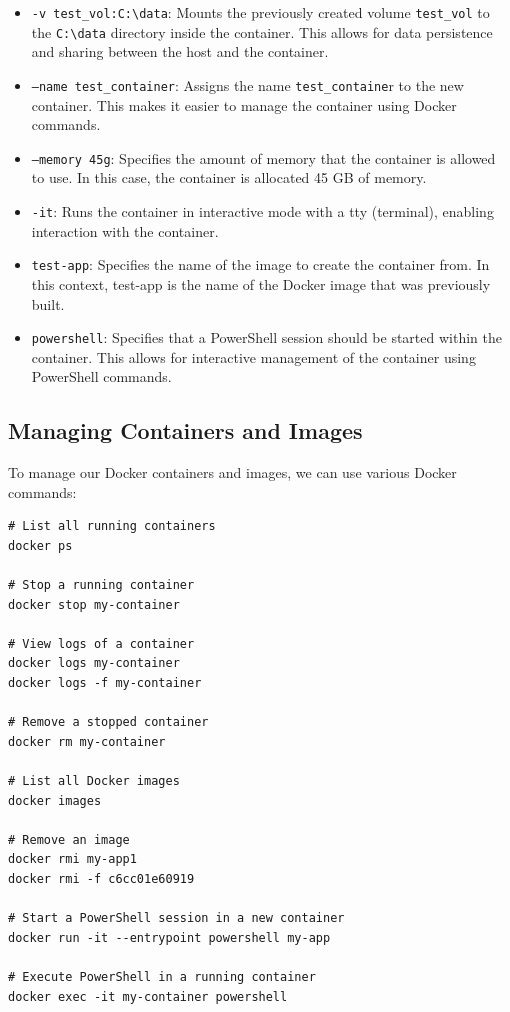 \documentclass{article}
\begin{document}
\begin{itemize}
\item \texttt{-v test\_vol:C:\textbackslash{}data}: Mounts the previously created volume \texttt{test\_vol} to the \texttt{C:\textbackslash{}data} directory inside the container. This allows for data persistence and sharing between the host and the container.
\item \texttt{--name test\_container}: Assigns the name \texttt{test\_containe}r to the new container. This makes it easier to manage the container using Docker commands.
\item \texttt{--memory 45g}: Specifies the amount of memory that the container is allowed to use. In this case, the container is allocated 45 GB of memory.
\item \texttt{-it}: Runs the container in interactive mode with a tty (terminal), enabling interaction with the container.
\item \texttt{test-app}: Specifies the name of the image to create the container from. In this context, test-app is the name of the Docker image that was previously built.
\item \texttt{powershell}: Specifies that a PowerShell session should be started within the container. This allows for interactive management of the container using PowerShell commands.
\end{itemize}


\subsection{Managing Containers and Images}
To manage our Docker containers and images, we can use various Docker commands:

\begin{lstlisting}
# List all running containers
docker ps

# Stop a running container
docker stop my-container

# View logs of a container
docker logs my-container
docker logs -f my-container

# Remove a stopped container
docker rm my-container

# List all Docker images
docker images

# Remove an image
docker rmi my-app1
docker rmi -f c6cc01e60919

# Start a PowerShell session in a new container
docker run -it --entrypoint powershell my-app

# Execute PowerShell in a running container
docker exec -it my-container powershell
\end{lstlisting}
\end{document}

